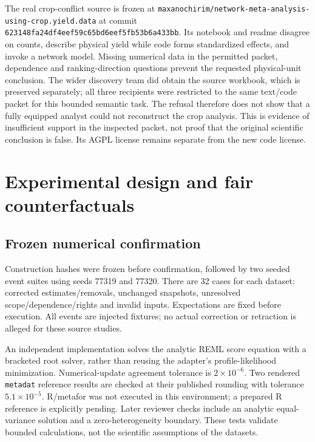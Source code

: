 The real crop-conflict source is frozen at \nolinkurl{maxanochirim/network-meta-analysis-using-crop.yield.data} at commit \nolinkurl{623148fa24df4eef59c65bd6eef5fb53b6a433bb}. Its notebook and readme disagree on counts, describe physical yield while code forms standardized effects, and invoke a network model. Missing numerical data in the permitted packet, dependence and ranking-direction questions prevent the requested physical-unit conclusion. The wider discovery team did obtain the source workbook, which is preserved separately; all three recipients were restricted to the same text/code packet for this bounded semantic task. The refusal therefore does not show that a fully equipped analyst could not reconstruct the crop analysis. This is evidence of insufficient support in the inspected packet, not proof that the original scientific conclusion is false. Its AGPL license remains separate from the new code license.\citep{crop}

\section{Experimental design and fair counterfactuals}

\subsection{Frozen numerical confirmation}

Construction hashes were frozen before confirmation, followed by two seeded event suites using seeds 77319 and 77320. There are 32 cases for each dataset: corrected estimates/removals, unchanged snapshots, unresolved scope/dependence/rights and invalid inputs. Expectations are fixed before execution. All events are injected fixtures; no actual correction or retraction is alleged for these source studies.

An independent implementation solves the analytic REML score equation with a bracketed root solver, rather than reusing the adapter's profile-likelihood minimization. Numerical-update agreement tolerance is $2\times 10^{-6}$. Two rendered \texttt{metadat} reference results are checked at their published rounding with tolerance $5.1\times 10^{-5}$. R/metafor was not executed in this environment; a prepared R reference is explicitly pending. Later reviewer checks include an analytic equal-variance solution and a zero-heterogeneity boundary. These tests validate bounded calculations, not the scientific assumptions of the datasets.

